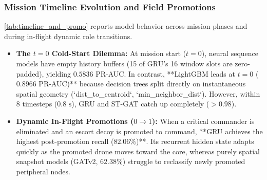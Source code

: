 \documentclass[9pt]{ieeeconf}
\begin{document}
\subsubsection{Mission Timeline Evolution and Field Promotions}
\cref{tab:timeline_and_promo} reports model behavior across mission phases and during in-flight dynamic role transitions.

\begin{table}[h]
\centering
\caption{Timeline Progression and Field Promotion Tracking}
\label{tab:timeline_and_promo}
\scriptsize
{}
\end{table}

\begin{itemize}
    \item \textbf{The $t=0$ Cold-Start Dilemma:} At mission start ($t=0$), neural sequence models have empty history buffers (15 of GRU's 16 window slots are zero-padded), yielding $0.5836$ PR-AUC. In contrast, **LightGBM leads at $t=0$ ($0.8966$ PR-AUC)** because decision trees split directly on instantaneous spatial geometry (`dist_to_centroid`, `min_neighbor_dist`). However, within 8 timesteps ($0.8\text{ s}$), GRU and ST-GAT catch up completely ($>0.98$).
    \item \textbf{Dynamic In-Flight Promotions ($0 \to 1$):} When a critical commander is eliminated and an escort decoy is promoted to command, **GRU achieves the highest post-promotion recall ($82.06\%$)**. Its recurrent hidden state adapts quickly as the promoted drone moves toward the core, whereas purely spatial snapshot models (GATv2, $62.38\%$) struggle to reclassify newly promoted peripheral nodes.
\end{itemize}
\end{document}
